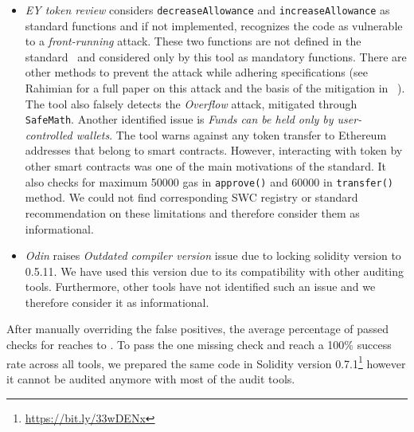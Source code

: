 \begin{itemize}[noitemsep,topsep=0pt]
	\item \textit{EY token review} considers \texttt{decreaseAllowance} and \texttt{increaseAllowance} as standard \erc functions and if not implemented, recognizes the code as vulnerable to a \textit{front-running} attack. These two functions are not defined in the \erc standard~\cite{ERC20Std} and considered only by this tool as mandatory functions. There are other methods to prevent the attack while adhering \erc specifications (see Rahimian \etal for a full paper on this attack and the basis of the mitigation in \sys~\cite{ERC20MWA}). The tool also falsely detects the \textit{Overflow} attack, mitigated through \texttt{SafeMath}. Another identified issue is \textit{Funds can be held only by user-controlled wallets}. The tool warns against any token transfer to Ethereum addresses that belong to smart contracts. However, interacting with \erc token by other smart contracts was one of the main motivations of the \erc standard. It also checks for maximum 50000 gas in \texttt{approve()} and 60000 in \texttt{transfer()} method. We could not find corresponding SWC registry or standard recommendation on these limitations and therefore consider them as informational.

	\item \textit{Odin} raises \textit{Outdated compiler version} issue due to locking solidity version to 0.5.11. We have used this version due to its compatibility with other auditing tools. Furthermore, other tools have not identified such an issue and we therefore consider it as informational.
\end{itemize}

After manually overriding the false positives, the average percentage of passed checks for \sys reaches to \prct. To pass the one missing check and reach a 100\% success rate across all tools, we prepared the same code in Solidity version 0.7.1\footnote{\url{https://bit.ly/33wDENx}} however it cannot be audited anymore with most of the audit tools. 